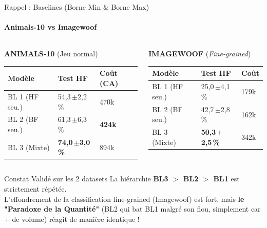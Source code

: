 \documentclass[aspectratio=169, 10pt]{beamer}
\newcommand{\pms}[2]{#1{\tiny\,$\pm$#2}\,\%}
\begin{document}
\begin{frame}{Rappel : Baselines (Borne Min \& Borne Max)}
\framesubtitle{Animals-10 vs Imagewoof}
  
  \begin{columns}[T]
    \begin{column}{0.48\textwidth}
      \centering
      \textbf{ANIMALS-10} (Jeu normal)\\
      \vspace{0.2cm}
      \scriptsize
      \renewcommand{\arraystretch}{1.3}
      \begin{tabular}{@{}lC{2cm}C{1.2cm}@{}}
        \toprule
        \color{primary}\textbf{Modèle} & \color{primary}\textbf{Test HF} & \color{primary}\textbf{Coût (CA)} \\
        \midrule
        BL 1 (HF seu.) & \pms{54,3}{2,2} & 470k \\
        BL 2 (BF seu.) & \pms{61,3}{6,3} & \textbf{424k} \\
        BL 3 (Mixte)   & \textbf{\pms{74,0}{3,0}} & 894k \\
        \bottomrule
      \end{tabular}
    \end{column}
    \begin{column}{0.48\textwidth}
      \centering
      \textbf{IMAGEWOOF} (\textit{Fine-grained})\\
      \vspace{0.2cm}
      \scriptsize
      \renewcommand{\arraystretch}{1.3}
      \begin{tabular}{@{}lC{2cm}C{1.2cm}@{}}
        \toprule
        \color{primary}\textbf{Modèle} & \color{primary}\textbf{Test HF} & \color{primary}\textbf{Coût} \\
        \midrule
        BL 1 (HF seu.) & \pms{25,0}{4,1} & 179k \\
        BL 2 (BF seu.) & \pms{42,7}{2,8} & 162k \\
        BL 3 (Mixte)   & \textbf{\pms{50,3}{2,5}} & 342k \\
        \bottomrule
      \end{tabular}
    \end{column}
  \end{columns}

  \vspace{0.5cm}
  \begin{block}{\footnotesize Constat Validé sur les 2 datasets}
    \footnotesize La hiérarchie \textbf{BL3 $>$ BL2 $>$ BL1} est strictement répétée. \\
    L'effondrement de la classification fine-grained (Imagewoof) est fort, mais \textbf{le "Paradoxe de la Quantité"} (BL2 qui bat BL1 malgré son flou, simplement car + de volume) réagit de manière identique !
  \end{block}
\end{frame}
\end{document}
